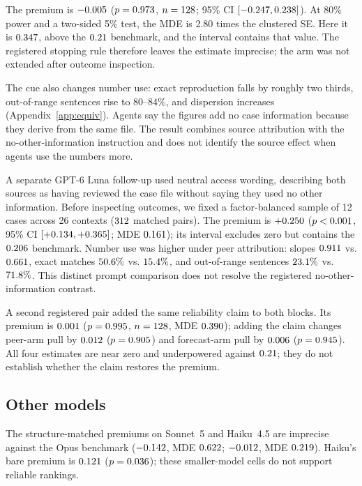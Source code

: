 \documentclass{article}
\begin{document}
The premium is $-0.005$ ($p=0.973$, $n=128$; 95\% CI $[-0.247,0.238]$). At 80\% power and a
two-sided 5\% test, the MDE is 2.80 times the clustered SE. Here it is $0.347$, above the $0.21$
benchmark, and the interval contains that value. The registered stopping rule therefore leaves the
estimate imprecise; the arm was not extended after outcome inspection.

The cue also changes number use: exact reproduction falls by roughly two thirds, out-of-range
sentences rise to $80$--$84\%$, and dispersion increases (Appendix~\ref{app:equiv}). Agents say the
figures add no case information because they derive from the same file. The result combines source
attribution with the no-other-information instruction and does not identify the source effect when
agents use the numbers more.

A separate GPT-6 Luna follow-up used neutral access wording, describing both sources as having
reviewed the case file without saying they used no other information. Before inspecting outcomes, we
fixed a factor-balanced sample of 12 cases across 26 contexts ($312$ matched pairs). The
premium is $+0.250$ ($p<0.001$, 95\% CI $[+0.134,+0.365]$; MDE $0.161$); its
interval excludes zero but contains the $0.206$ benchmark. Number use was higher under peer
attribution: slopes $0.911$ vs. $0.661$, exact matches $50.6\%$ vs.
$15.4\%$, and out-of-range sentences $23.1\%$ vs. $71.8\%$.
This distinct prompt comparison does not resolve the registered no-other-information contrast.

A second registered pair added the same reliability claim to both blocks. Its premium is $0.001$
($p=0.995$, $n=128$, MDE $0.390$); adding the claim changes peer-arm pull by $0.012$
($p=0.905$) and forecast-arm pull by $0.006$ ($p=0.945$). All four estimates are near
zero and underpowered against $0.21$; they do not establish whether the claim restores the premium.

\subsection{Other models}
\label{sec:across}

The structure-matched premiums on Sonnet~5 and Haiku~4.5 are imprecise against the Opus benchmark
($-0.142$, MDE $0.622$; $-0.012$, MDE $0.219$). Haiku's bare premium is
$0.121$ ($p=0.036$); these smaller-model cells do not support reliable rankings.
\end{document}
